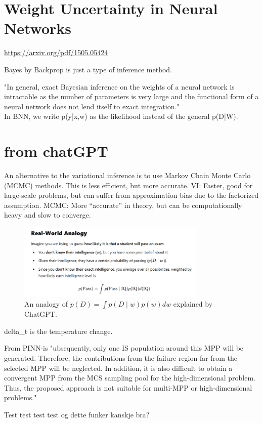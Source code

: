 \section{Weight Uncertainty in Neural Networks}
\url{https://arxiv.org/pdf/1505.05424}

Bayes by Backprop is just a type of inference method.

"In general, exact Bayesian inference on the weights of a neural network is intractable as the number of parameters is very large and the functional form of a neural network does not lend itself to exact integration."
\\
In BNN, we write p(y|x,w) as the likelihood instead of the general p(D|W). 


\section{from chatGPT}

An alternative to the variational inference is to use Markov Chain Monte Carlo (MCMC) methods. This is less efficient, but more accurate. 
VI: Faster, good for large-scale problems, but can suffer from approximation bias due to the factorized assumption.
MCMC: More “accurate” in theory, but can be computationally heavy and slow to converge.

\begin{figure}
  \centering
  \includegraphics[width=0.8\textwidth]{figures/analogy_chatGPT.png}
  \caption{An analogy of \( p(D)=\int p(D \mid w)p(w)dw \) explained by ChatGPT.}
  \label{fig:analogy_chatGPT_unique_2}
\end{figure}



\gls{delta_t} is the temperature change.

From PINN-is
"ubsequently, only one IS population around this MPP will be generated. Therefore, the contributions from the failure region far from the selected MPP will be neglected. In addition, it is also difficult to obtain a convergent MPP from the MCS sampling pool for the high-dimensional problem. Thus, the proposed approach is not suitable for multi-MPP or high-dimensional problems."

Test test test test og dette funker kanskje bra?
